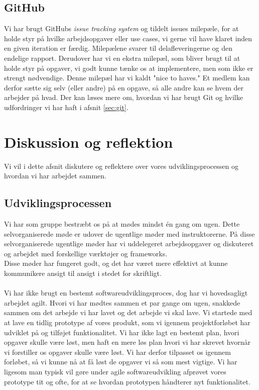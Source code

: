 \documentclass[12pt]{article}
\begin{document}
\subsection{GitHub}
Vi har brugt GitHubs \textit{issue tracking system}\cite{issuetracking} og tildelt issues milepæle, for at holde styr på hvilke arbejdsopgaver eller use cases, vi gerne vil have klaret inden en given iteration er færdig. Milepælene svarer til delafleveringerne og den endelige rapport. Derudover har vi en ekstra milepæl, som bliver brugt til at holde styr på opgaver, vi godt kunne tænke os at implementere, men som ikke er strengt nødvendige. Denne milepæl har vi kaldt "nice to haves."{} Et medlem kan derfor sætte sig selv (eller andre) på en opgave, så alle andre kan se hvem der arbejder på hvad. Der kan læses mere om, hvordan vi har brugt Git og hvilke udfordringer vi har haft i afsnit \ref{sec:git}.

\section{Diskussion og reflektion}
\label{sec:diskussion}
Vi vil i dette afsnit diskutere og reflektere over vores udviklingsprocessen og hvordan vi har arbejdet sammen.
\subsection{Udviklingsprocessen}
Vi har som gruppe bestræbt os på at mødes mindst én gang om ugen. Dette selvorganiserede møde er udover de ugentlige møder med instruktorerne. På disse selvorganiserede ugentlige møder har vi uddelegeret arbejdsopgaver og diskuteret og arbejdet med forskellige værktøjer og frameworks.\\
Disse møder har fungeret godt, og det har været mere effektivt at kunne kommunikere ansigt til ansigt i stedet for skriftligt. \\ \\
Vi har ikke brugt en bestemt softwareudviklingsproces, dog har vi hovedsagligt arbejdet agilt. Hvori vi har mødtes sammen et par gange om ugen, snakkede sammen om det arbejde vi har lavet og det arbejde vi skal lave. Vi startede med at lave en tidlig prototype af vores produkt, som vi igennem projektforløbet har udviklet på og tilføjet funktionalitet. Vi har ikke lagt en bestemt plan, hvori opgaver skulle være løst, men haft en mere løs plan hvori vi har skrevet hvornår vi forstiller os opgaver skulle være løst. Vi har derfor tilpasset os igennem forløbet, så vi kunne nå at få løst de opgaver vi så som mest vigtige. Vi har ligesom man typisk vil gøre under agile softwareudvikling afprøvet vores prototype tit og ofte, for at se hvordan prototypen håndterer nyt funktionalitet.
\end{document}
